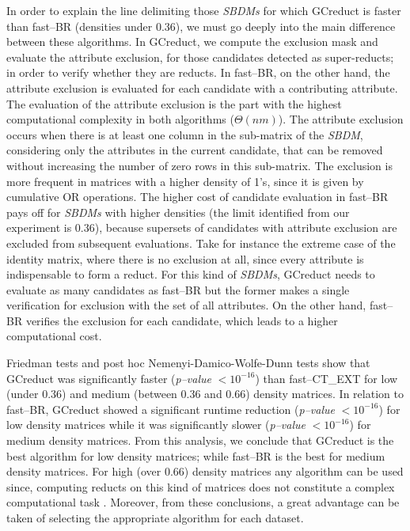 \documentclass[authoryear,11pt]{elsarticle}
\begin{document}
  In order to explain the line delimiting those \textit{SBDMs} for which GCreduct is faster than fast--BR (densities under 0.36), we must go deeply into the main difference between these algorithms. In GCreduct, we compute the exclusion mask and evaluate the attribute exclusion, for those candidates detected as super-reducts; in order to verify whether they are reducts. In fast--BR, on the other hand, the attribute exclusion is evaluated for each candidate with a contributing attribute. The evaluation of the attribute exclusion is the part with the highest computational complexity in both algorithms ($\Theta (nm)$). The attribute exclusion occurs when there is at least one column in the sub-matrix of the \textit{SBDM}, considering only the attributes in the current candidate, that can be removed without increasing the number of zero rows in this sub-matrix. The exclusion is more frequent in matrices with a higher density of 1's, since it is given by cumulative OR operations. The higher cost of candidate evaluation in fast--BR pays off for \textit{SBDMs} with higher densities (the limit identified from our experiment is 0.36), because supersets of candidates with attribute exclusion are excluded from subsequent evaluations. Take for instance the extreme case of the identity matrix, where there is no exclusion at all, since every attribute is indispensable to form a reduct. For this kind of \textit{SBDMs}, GCreduct needs to evaluate as many candidates as fast--BR but the former makes a single verification for exclusion with the set of all attributes. On the other hand, fast--BR verifies the exclusion for each candidate, which leads to a higher computational cost.

  Friedman tests and post hoc Nemenyi-Damico-Wolfe-Dunn tests show that GCreduct was significantly faster (\textit{p--value} $< 10^{-16}$) than fast--CT\_EXT for low (under 0.36) and medium (between 0.36 and 0.66) density matrices. In relation to fast--BR, GCreduct showed a significant runtime reduction (\textit{p--value} $< 10^{-16}$) for low density matrices while it was significantly slower (\textit{p--value} $< 10^{-16}$) for medium density matrices. From this analysis, we conclude that GCreduct is the best algorithm for low density matrices; while fast--BR is the best for medium density matrices. For high (over 0.66) density matrices any algorithm can be used since, computing reducts on this kind of matrices does not constitute a complex computational task \citep{Rojas12}. Moreover, from these conclusions, a great advantage can be taken of selecting the appropriate algorithm for each dataset. 
\end{document}
